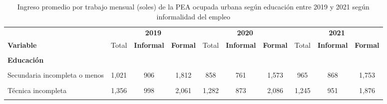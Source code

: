 \documentclass[
  letterpaper,
  12pt,
  oneside,
  spanish,
  doublespacing,
  headsepline,
  parskip]{MastersDoctoralThesis}
\begin{document}
\hypertarget{tbl-ing_edu}{}
\begin{table}[H]
\caption{\label{tbl-ing_edu}Ingreso promedio por trabajo mensual (soles) de la PEA ocupada urbana
según educación entre 2019 y 2021 según informalidad del empleo }\tabularnewline

\centering\begingroup\fontsize{9}{11}\selectfont

\begin{tabular}{>{\centering\arraybackslash}p{10em}ccccccccc}
\toprule
\multicolumn{1}{c}{ } & \multicolumn{3}{c}{\textbf{2019}} & \multicolumn{3}{c}{\textbf{2020}} & \multicolumn{3}{c}{\textbf{2021}} \\
\cmidrule(l{3pt}r{3pt}){2-4} \cmidrule(l{3pt}r{3pt}){5-7} \cmidrule(l{3pt}r{3pt}){8-10}
\textbf{Variable} & Total & \textbf{Informal} & \textbf{Formal} & Total & \textbf{Informal} & \textbf{Formal} & Total & \textbf{Informal} & \textbf{Formal}\\
\midrule
\cellcolor{gray!6}{\textbf{Nacional}} & \cellcolor{gray!6}{1,595} & \cellcolor{gray!6}{1,037} & \cellcolor{gray!6}{2,599} & \cellcolor{gray!6}{1,407} & \cellcolor{gray!6}{901} & \cellcolor{gray!6}{2,380} & \cellcolor{gray!6}{1,443} & \cellcolor{gray!6}{989} & \cellcolor{gray!6}{2,473}\\
\textbf{Educación} &  &  &  &  &  &  &  &  & \\
\cellcolor{gray!6}{Sin nivel} & \cellcolor{gray!6}{597} & \cellcolor{gray!6}{520} & \cellcolor{gray!6}{1,610} & \cellcolor{gray!6}{586} & \cellcolor{gray!6}{533} & \cellcolor{gray!6}{1,544} & \cellcolor{gray!6}{569} & \cellcolor{gray!6}{527} & \cellcolor{gray!6}{1,709}\\
Secundaria incompleta o menos & 1,021 & 906 & 1,812 & 858 & 761 & 1,573 & 965 & 868 & 1,753\\
\cellcolor{gray!6}{Secundaria completa} & \cellcolor{gray!6}{1,367} & \cellcolor{gray!6}{1,085} & \cellcolor{gray!6}{2,068} & \cellcolor{gray!6}{1,164} & \cellcolor{gray!6}{921} & \cellcolor{gray!6}{1,833} & \cellcolor{gray!6}{1,224} & \cellcolor{gray!6}{1,011} & \cellcolor{gray!6}{1,902}\\
\addlinespace
Técnica incompleta & 1,356 & 998 & 2,061 & 1,282 & 873 & 2,086 & 1,245 & 951 & 1,876\\
\cellcolor{gray!6}{Técnica completa} & \cellcolor{gray!6}{1,789} & \cellcolor{gray!6}{1,162} & \cellcolor{gray!6}{2,291} & \cellcolor{gray!6}{1,635} & \cellcolor{gray!6}{983} & \cellcolor{gray!6}{2,131} & \cellcolor{gray!6}{1,681} & \cellcolor{gray!6}{1,075} & \cellcolor{gray!6}{2,254}\\

\end{tabular}
\end{table}
\end{document}
